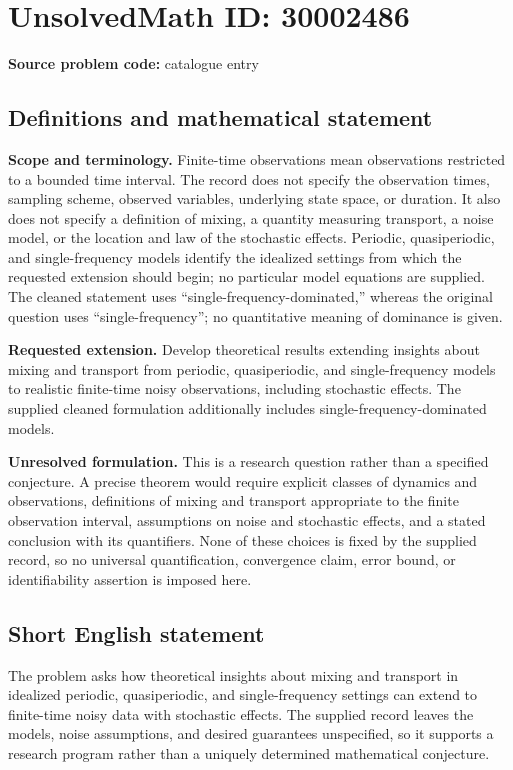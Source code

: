 \documentclass[11pt]{article}
\begin{document}
\section*{UnsolvedMath ID: 30002486}
\textbf{Source problem code:} catalogue entry
\subsection{Definitions and mathematical statement}
\textbf{Scope and terminology.} Finite-time observations mean observations restricted to a bounded time interval. The record does not specify the observation times, sampling scheme, observed variables, underlying state space, or duration. It also does not specify a definition of mixing, a quantity measuring transport, a noise model, or the location and law of the stochastic effects. Periodic, quasiperiodic, and single-frequency models identify the idealized settings from which the requested extension should begin; no particular model equations are supplied. The cleaned statement uses ``single-frequency-dominated,'' whereas the original question uses ``single-frequency''; no quantitative meaning of dominance is given.

\textbf{Requested extension.} Develop theoretical results extending insights about mixing and transport from periodic, quasiperiodic, and single-frequency models to realistic finite-time noisy observations, including stochastic effects. The supplied cleaned formulation additionally includes single-frequency-dominated models.

\textbf{Unresolved formulation.} This is a research question rather than a specified conjecture. A precise theorem would require explicit classes of dynamics and observations, definitions of mixing and transport appropriate to the finite observation interval, assumptions on noise and stochastic effects, and a stated conclusion with its quantifiers. None of these choices is fixed by the supplied record, so no universal quantification, convergence claim, error bound, or identifiability assertion is imposed here.
\subsection{Short English statement}
The problem asks how theoretical insights about mixing and transport in idealized periodic, quasiperiodic, and single-frequency settings can extend to finite-time noisy data with stochastic effects. The supplied record leaves the models, noise assumptions, and desired guarantees unspecified, so it supports a research program rather than a uniquely determined mathematical conjecture.
\end{document}

